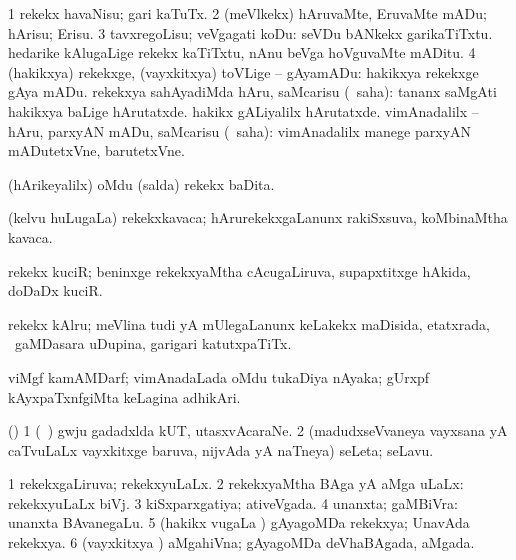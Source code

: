 {{{{{{ \bentry
{} 
\gl{\sakirx}
\bmng
\bnum
\num{1} rekekx havaNisu; gari kaTuTx. 
\num{2} (meVlkekx) hAruvaMte, EruvaMte mADu; hArisu; Erisu. 
\num{3} tavxregoLisu; veVgagati koDu:  seVDu bANkekx garikaTiTxtu.  hedarike kAlugaLige rekekx kaTiTxtu, nAnu beVga hoVguvaMte mADitu. 
\num{4} (hakikxya) rekekxge, (vayxkitxya) toVLige -- gAyamADu:  hakikxya rekekxge gAya mADu. 
\banum
{} rekekxya sahAyadiMda hAru, saMcarisu (\akirx\ saha):  tananx saMgAti hakikxya baLige hArutatxde.  hakikx gALiyalilx hArutatxde. 
 vimAnadalilx -- hAru, parxyAN mADu, saMcarisu (\akirx\ saha):  vimAnadalilx manege parxyAN mADutetxVne, barutetxVne. 
\eanum
\numie
\enum
\emng
\eentry

\bentry
{}
  \gl{\nA}\bmng
(hArikeyalilx) oMdu (salda) rekekx baDita. 
\emng
\eentry

\bentry
{}
  \gl{\nA}\bmng
(kelvu huLugaLa) rekekxkavaca; hArurekekxgaLanunx rakiSxsuva, koMbinaMtha kavaca. 
\emng
\eentry

\bentry
{}
  \gl{\nA}\bmng
rekekx kuciR; beninxge rekekxyaMtha cAcugaLiruva, supapxtitxge hAkida, doDaDx kuciR. 
\emng
\eentry

\bentry
{}
  \gl{\nA}\bmng
rekekx kAlru; meVlina tudi yA mUlegaLanunx keLakekx maDisida, etatxrada, \kanmu\ gaMDasara uDupina, garigari katutxpaTiTx. 
\emng
\eentry

\bentry
{}
 \gl{\nA}\bmng
viMgf kamAMDarf; vimAnadaLada oMdu tukaDiya nAyaka; gUrxpf kAyxpaTxnfgiMta keLagina  adhikAri. 
\emng
\eentry

\bentry
{}
  \gl{\nA}\bmng
(\ashi) 
\bnum
\num{1} (\kanmu\ \ame) gwju gadadxlda kUT, utasxvAcaraNe. 
\num{2} (madudxseVvaneya vayxsana yA caTvuLaLx vayxkitxge baruva, nijvAda yA naTneya) seLeta; seLavu. 
\enum
\emng
\eentry

\bentry
{}
  \gl{\gu}\bmng
\bnum
\num{1} rekekxgaLiruva; rekekxyuLaLx. 
\num{2} rekekxyaMtha BAga yA aMga uLaLx:  rekekxyuLaLx biVj. 
\num{3} kiSxparxgatiya; ativeVgada. 
\num{4} unanxta; gaMBiVra:  unanxta BAvanegaLu. 
\num{5} (hakikx \mo vugaLa \vi) gAyagoMDa rekekxya; UnavAda rekekxya. 
\num{6} (vayxkitxya \vi) aMgahiVna; gAyagoMDa deVhaBAgada, aMgada. 
\enum
\emng
\eentry

}}}}}}
